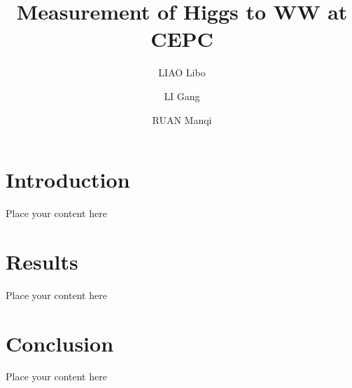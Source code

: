 \documentclass[coverpage]{cepcnote} %
\title{Measurement of Higgs to WW at CEPC}
\author[a]{LIAO Libo}
\author[b]{LI Gang}
\author[b]{RUAN Manqi}
\affil[a]{Hangzhou Normal University}
\affil[b]{Institute of High Energy Physics}
\begin{document}
% 

\section{Introduction}

{\color{red} Place your content here}

\section{Results}

Place your content here

\section{Conclusion}

Place your content here
\end{document}
